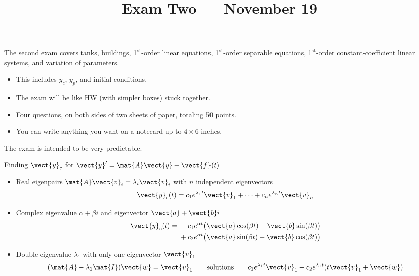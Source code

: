\documentclass[11pt,aspectratio=169]{beamer}
\title{Exam Two --- November 19}
\date{}
\begin{document}
\begin{frame}{\inserttitle}
The second exam covers tanks, buildings, 1\textsuperscript{st}-order linear equations, 1\textsuperscript{st}-order separable equations, 1\textsuperscript{st}-order constant-coefficient linear systems, and variation of parameters.
  \begin{itemize}
  	\item This includes $y_c$, $y_p$, and initial conditions.
  	\item The exam will be like HW (with simpler boxes) stuck together.
  	\item Four questions, on both sides of two sheets of paper, totaling 50 points.
  	\item You can write anything you want on a notecard up to $4\times6$ inches. 

  \end{itemize}

The exam is intended to be very predictable.
\end{frame}
\begin{frame}{Finding $\vect{y}_c$ for $\vect{y}'=\mat{A}\vect{y}+\vect{f}(t)$}
\begin{itemize}
\item Real eigenpairs $\mat{A}\vect{v}_i=\lambda_i\vect{v}_i$ with $n$ independent eigenvectors
\[
\vect{y}_c(t)=c_1e^{\lambda_1t}\vect{v}_1+\cdots+c_ne^{\lambda_nt}\vect{v}_n
\]
\item Complex eigenvalue $\alpha+\beta i$ and eigenvector $\vect{a}+\vect{b}i$
\[
\begin{aligned}
\vect{y}_c(t)=\phantom{{}+{}}&c_1e^{\alpha t}\bigl(\vect{a}\cos(\beta t)-\vect{b}\sin(\beta t)\bigr)\\
{}+{}&c_2e^{\alpha t}\bigl(\vect{a}\sin(\beta t)+\vect{b}\cos(\beta t)\bigr)
\end{aligned}
\]
\item Double eigenvalue $\lambda_1$ with only one eigenvector $\vect{v}_1$
\[
(\mat{A}-\lambda_1\mat{I})\vect{w}=\vect{v}_1
\qquad\text{solutions}\qquad
c_1e^{\lambda_1t}\vect{v}_1+c_2e^{\lambda_1t}(t\vect{v}_1+\vect{w})
\]
\end{itemize}
\end{frame}
\end{document}
